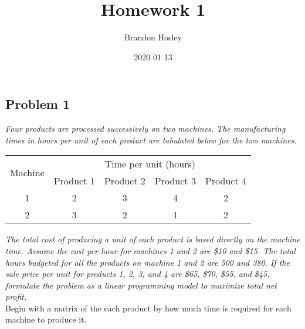 \documentclass[a4paper,man,natbib]{apa6}
\title{Homework 1}
\author{Brandon Hosley}
\date{2020 01 13}
\affiliation{DAT 332 - Matrix Analysis and Numeric Optimization \\
	Liang Kong}
\begin{document}
\maketitle
\raggedbottom

\subsection{Problem 1}
\singlespacing
\emph{
Four products are processed successively on two machines.
The manufacturing times in hours per unit of each product 
are tabulated below for the two machines. }
\begin{center}	
	\begin{tabular}{|c|c|c|c|c|}
		\hline
		\multirow{2}{*}{Machine} & \multicolumn{4}{|c|}{Time per unit (hours)} \\
		\cline{2-5}
		& Product 1 & Product 2 & Product 3 & Product 4 \\ \hline
		1 & 2 & 3 & 4 & 2 \\ \hline
		2 & 3 & 2 & 1 & 2 \\ \hline
	\end{tabular} 
\end{center}
\emph{
The total cost of producing a unit of each product is based directly on the machine time.  
Assume the cost per hour for  machines 1 and 2 are \$10 and \$15.  
The total hours budgeted for all the products on machine 1 and 2 are 500 and 380.  
If the sale price per unit for products 1, 2, 3, and 4 are \$65, \$70, \$55, and  \$45, 
formulate the problem as a linear programming model to maximize total net profit. 
} \\
\doublespacing
Begin with a matrix of the each product by how much time is required for each machine to produce it. \\
\end{document}
